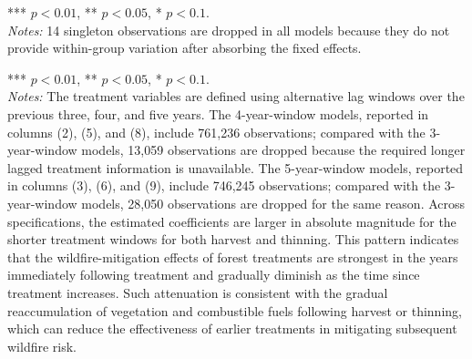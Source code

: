\documentclass{article}
\begin{document}
\begin{table}[!htbp]
\centering
\caption*{Table A1. Direct effects of fuel reduction treatment on wildfire risk}
\begin{minipage}{\textwidth}
\footnotesize
*** $p<0.01$, ** $p<0.05$, * $p<0.1$.\\
\textit{Notes:} 14 singleton observations are dropped in all models because they do not provide within-group variation after absorbing the fixed effects.
\end{minipage}
\end{table}

\begin{table}[!htbp]
\centering
\caption*{Table A2. Robustness tests with alternative treatment windows}
\begin{minipage}{\textwidth}
\footnotesize
*** $p<0.01$, ** $p<0.05$, * $p<0.1$.\\
\textit{Notes:} The treatment variables are defined using alternative lag windows over the previous three, four, and five years. 
The 4-year-window models, reported in columns (2), (5), and (8), include 761,236 observations; compared with the 3-year-window models, 
13,059 observations are dropped because the required longer lagged treatment information is unavailable. The 5-year-window models, reported 
in columns (3), (6), and (9), include 746,245 observations; compared with the 3-year-window models, 28,050 observations are dropped for the
 same reason. Across specifications, the estimated coefficients are larger in absolute magnitude for the shorter treatment windows for both 
 harvest and thinning. This pattern indicates that the wildfire-mitigation effects of forest treatments are strongest in the years immediately 
 following treatment and gradually diminish as the time since treatment increases.
 Such attenuation is consistent with the gradual reaccumulation of vegetation and combustible fuels following harvest or thinning, 
 which can reduce the effectiveness of earlier treatments in mitigating subsequent wildfire risk.
\end{minipage}
\end{table}
\end{document}
